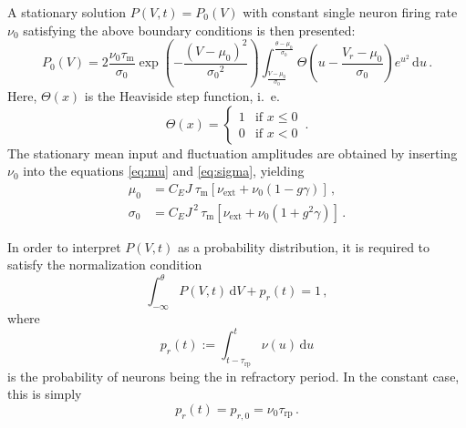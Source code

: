 A stationary solution $P(V, t) = P_0(V)$ with constant 
single neuron firing rate $\nu_0$ 
satisfying the above boundary conditions is then presented:
\begin{equation}
    P_0(V) = 2 \frac{\nu_0 \tau_\text{m}}{\sigma_0} 
        \exp{\left(- \frac{(V - \mu_0)^2}{{\sigma_0}^2} \right)}
        \int_{\frac{V - \mu_0}{\sigma_0}}^{\frac{\theta - \mu_0}{\sigma_0}} \! 
            \Theta \left(u - \frac{V_r - \mu_0}{\sigma_0} \right) e^{u^2} \, \text{d}u  \,. 
    \label{eq:P_V_0}
\end{equation}
Here, $\Theta(x)$ is the Heaviside step function, i.~e. 
\begin{equation}
    \Theta(x) = \begin{cases} 1 & \text{if } x \le 0 \\ 0 & \text{if } x < 0 \end{cases}  \,.
    \label{eq:heaviside}
\end{equation}
The stationary mean input and fluctuation amplitudes are obtained by inserting 
$\nu_0$ into the equations \eqref{eq:mu} and \eqref{eq:sigma}, yielding 
\begin{align}
    \mu_0 	    &= C_E J \:\tau_\text{m} [\nu_\text{ext} + \nu_0(1 - g \gamma)]  \,, \\ 
    \sigma_0 	&= C_E J^{\,2} \,\tau_\text{m} [\nu_\text{ext} + \nu_0(1 + g^2 \gamma)] \,.
    \label{eq:mu_sigma_0}
\end{align}

In order to interpret $P(V, t)$ as a probability distribution, it is required to
satisfy the normalization condition
\begin{equation}
    \int_{-\infty}^{\theta} \! P(V, t) \, \text{d}V  + p_r(t) = 1 \, ,
    \label{eq:P_V_prob}
\end{equation}
where 
\begin{equation}
    p_r(t) := \int_{t - \tau_\text{rp}}^{t} \! \nu(u) \, \text{d}u 
    \label{eq:p_r}
\end{equation}
is the probability of neurons being the in refractory period.
In the constant case, this is simply 
\begin{equation}
    p_r(t) = p_{r, 0} = \nu_0 \tau_\text{rp}  \,.
    \label{eq:p_r_0}
\end{equation}

